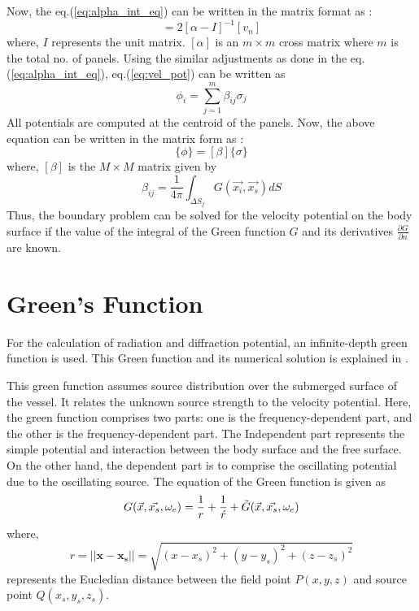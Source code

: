 Now, the eq.(\ref{eq:alpha_int_eq}) can be written in the matrix format as :
\begin{equation}
    [\sigma] = 2[\alpha - I]^{-1}[v_n]
\end{equation}
where, $I$ represents the unit matrix. $[\alpha]$ is an $m\times m$ cross matrix where $m$ is the total no. of panels. Using the similar adjustments as done in the eq.(\ref{eq:alpha_int_eq}), eq.(\ref{eq:vel_pot}) can be written as
\begin{equation}
    \phi_i = \sum_{j=1}^{m}\beta_{ij}\sigma_{j}
\end{equation}
All potentials are computed at the centroid of the panels. Now, the above equation can be written in the matrix form as :
\begin{equation}
    \{\phi\} = [\beta]\{\sigma\}
\end{equation}
where, $[\beta]$ is the $M\times M$ matrix given by
\begin{equation}
    \label{eq:beta_eq}
    \beta_{ij} = \frac{1}{4\pi}\int_{\Delta S_j}G(\Vec{x_i}, \vec{x_s}) dS  
\end{equation}
Thus, the boundary problem can be solved for the velocity potential on the body surface if the value of the integral of the Green function $G$ and its derivatives $\frac{\partial G}{\partial n}$ are known.
\section{Green's Function}
\label{sec:green_fun}
For the calculation of radiation and diffraction potential, an infinite-depth green function is used. This Green function and its numerical solution is explained in \cite{telste1986numerical}. 

This green function assumes source distribution over the submerged surface of the vessel. It relates the unknown source strength to the velocity potential. Here, the green function comprises two parts: one is the frequency-dependent part, and the other is the frequency-dependent part.  The Independent part represents the simple potential and interaction between the body surface and the free surface. On the other hand, the dependent part is to comprise the oscillating potential due to the oscillating source.
The equation of the Green function is given as 
\begin{equation}
    \label{eq:green_eq}
    G(\vec{x}, \vec{x_s}, \omega_e) = \frac{1}{r} + \frac{1}{\acute{r}} + \Tilde{G}(\vec{x}, \vec{x_s}, \omega_e) 
\end{equation}
where, 
\begin{equation}
    r = ||\boldsymbol{x} - \boldsymbol{x_s}|| = \sqrt{(x-x_s)^2+(y-y_s)^2+(z-z_s)^2}
\end{equation}
represents the Eucledian distance between the field point $P(x, y, z)$ and source point $Q(x_s, y_s, z_s)$.


